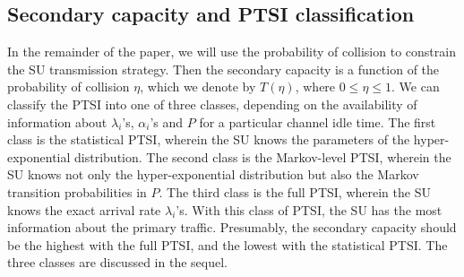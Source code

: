 \documentclass[10pt,final,journal,letterpaper]{IEEEtran}
\begin{document}
\subsection{Secondary capacity and PTSI classification}
In the remainder of the paper, we will use the probability of collision to constrain the SU transmission strategy. Then the secondary capacity is a function of the probability of collision $\eta$, which we denote by $T(\eta)$, where $0\leq\eta\leq 1$. We can classify the PTSI into one of three classes, depending on the availability of information about $\lambda_i$'s, $\alpha_i$'s and $P$ for a particular channel idle time. The first class is the statistical PTSI, wherein the SU knows the parameters of the hyper-exponential distribution. The second class is the Markov-level PTSI, wherein the SU knows not only the hyper-exponential distribution but also the Markov transition probabilities in $P$. The third class is the full PTSI, wherein the SU knows the exact arrival rate $\lambda_i$'s. With this class of PTSI, the SU has the most information about the primary traffic. Presumably, the secondary capacity should be the highest with the full PTSI, and the lowest with the statistical PTSI. The three classes are discussed in the sequel.
\end{document}
